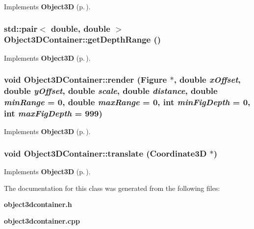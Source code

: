Implements {\bf Object3D} {\rm (p.\,\pageref{classObject3D_a2})}.
\subsubsection{\setlength{\rightskip}{0pt plus 5cm}std::pair$<$ double, double $>$ Object3DContainer::get\-Depth\-Range ()\hspace{0.3cm}{\tt  [virtual]}}\label{classObject3DContainer_a0}




Implements {\bf Object3D} {\rm (p.\,\pageref{classObject3D_a0})}.
\subsubsection{\setlength{\rightskip}{0pt plus 5cm}void Object3DContainer::render ({\bf Figure} $\ast$, double {\em x\-Offset}, double {\em y\-Offset}, double {\em scale}, double {\em distance}, double {\em min\-Range} = 0, double {\em max\-Range} = 0, int {\em min\-Fig\-Depth} = 0, int {\em max\-Fig\-Depth} = 999)\hspace{0.3cm}{\tt  [virtual]}}\label{classObject3DContainer_a1}




Implements {\bf Object3D} {\rm (p.\,\pageref{classObject3D_a1})}.
\subsubsection{\setlength{\rightskip}{0pt plus 5cm}void Object3DContainer::translate ({\bf Coordinate3D} $\ast$)\hspace{0.3cm}{\tt  [virtual]}}\label{classObject3DContainer_a3}




Implements {\bf Object3D} {\rm (p.\,\pageref{classObject3D_a3})}.

The documentation for this class was generated from the following files:\begin{CompactItemize}
\item 
{\bf object3dcontainer.h}\item 
{\bf object3dcontainer.cpp}\end{CompactItemize}
